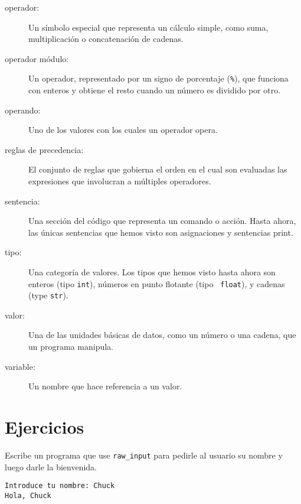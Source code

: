 \begin{description}
\item[operador:]  Un símbolo especial que representa un cálculo simple, como
suma, multiplicación o concatenación de cadenas.

\item[operador módulo:]  Un operador, representado por un signo de porcentaje
({\tt \%}), que funciona con enteros y obtiene el resto cuando
un número es dividido por otro.

\item[operando:]  Uno de los valores con los cuales un operador opera.

\item[reglas de precedencia:]  El conjunto de reglas que gobierna el orden en el cual
son evaluadas las expresiones que involucran a múltiples operadores.

\item[sentencia:]  Una sección del código que representa un comando o acción.
Hasta ahora, las únicas sentencias que hemos visto son asignaciones y sentencias print.

\item[tipo:] Una categoría de valores. Los tipos que hemos visto hasta ahora
son enteros (tipo {\tt int}), números en punto flotante (tipo {\tt
float}), y cadenas (type {\tt str}).

\item[valor:] Una de las unidades básicas de datos, como un número o una cadena,
que un programa manipula.

\item[variable:] Un nombre que hace referencia a un valor.

\end{description}

\section{Ejercicios}

\begin{ex}
Escribe un programa que use \verb"raw_input" para pedirle al usuario su nombre
y luego darle la bienvenida.

\begin{verbatim}
Introduce tu nombre: Chuck
Hola, Chuck
\end{verbatim}

\end{ex}

